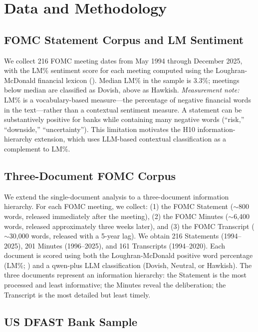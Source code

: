 \documentclass[12pt,a4paper]{article}
\begin{document}
\section{Data and Methodology}\label{sec:data}

\subsection{FOMC Statement Corpus and LM Sentiment}

We collect 216 FOMC meeting dates from May 1994 through December 2025, with the LM\% sentiment score for each meeting computed using the Loughran-McDonald financial lexicon (\citet{Loughran2011}). Median LM\% in the sample is 3.3\%; meetings below median are classified as Dovish, above as Hawkish. \textit{Measurement note:} LM\% is a vocabulary-based measure---the percentage of negative financial words in the text---rather than a contextual sentiment measure. A statement can be substantively positive for banks while containing many negative words (``risk,'' ``downside,'' ``uncertainty''). This limitation motivates the H10 information-hierarchy extension, which uses LLM-based contextual classification as a complement to LM\%.

\subsection{Three-Document FOMC Corpus}

We extend the single-document analysis to a three-document information hierarchy. For each FOMC meeting, we collect: (1) the FOMC Statement ($\sim$800 words, released immediately after the meeting), (2) the FOMC Minutes ($\sim$6,400 words, released approximately three weeks later), and (3) the FOMC Transcript ($\sim$30,000 words, released with a 5-year lag). We obtain 216 Statements (1994--2025), 201 Minutes (1996--2025), and 161 Transcripts (1994--2020). Each document is scored using both the Loughran-McDonald positive word percentage (LM\%; \citet{Loughran2011}) and a qwen-plus LLM classification (Dovish, Neutral, or Hawkish). The three documents represent an information hierarchy: the Statement is the most processed and least informative; the Minutes reveal the deliberation; the Transcript is the most detailed but least timely.

\subsection{US DFAST Bank Sample}
\end{document}
